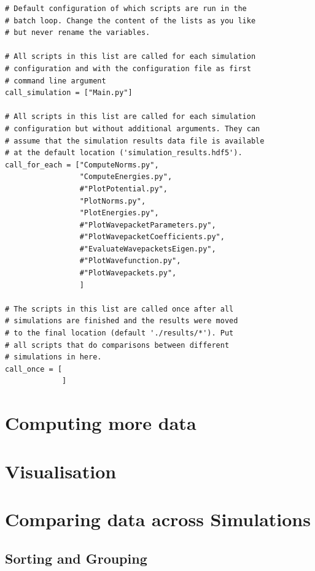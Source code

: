 \documentclass[a4paper,10pt]{report}
\begin{document}
\begin{lstlisting}[float=tp,frame=single,label=lstdefbatch02,caption={Default batch configuration \texttt{batchconfiguration.py}}]
# Default configuration of which scripts are run in the
# batch loop. Change the content of the lists as you like
# but never rename the variables.

# All scripts in this list are called for each simulation
# configuration and with the configuration file as first
# command line argument
call_simulation = ["Main.py"]

# All scripts in this list are called for each simulation
# configuration but without additional arguments. They can
# assume that the simulation results data file is available
# at the default location ('simulation_results.hdf5').
call_for_each = ["ComputeNorms.py",
                 "ComputeEnergies.py",
                 #"PlotPotential.py",
                 "PlotNorms.py",
                 "PlotEnergies.py",
                 #"PlotWavepacketParameters.py",
                 #"PlotWavepacketCoefficients.py",
                 #"EvaluateWavepacketsEigen.py",
                 #"PlotWavefunction.py",
                 #"PlotWavepackets.py",
                 ]

# The scripts in this list are called once after all
# simulations are finished and the results were moved
# to the final location (default './results/*'). Put
# all scripts that do comparisons between different
# simulations in here.
call_once = [
             ]
\end{lstlisting}





\section{Computing more data}


\section{Visualisation}


\section{Comparing data across Simulations}


\subsection{Sorting and Grouping}
\end{document}
